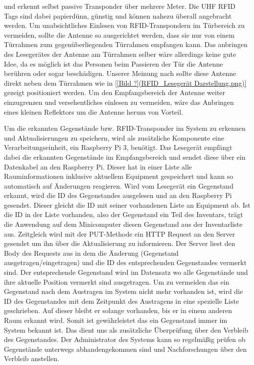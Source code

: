 und erkennt selbst passive Transponder über mehrere Meter. Die UHF RFID Tags
sind dabei papierdünn, günstig und können nahezu überall angebracht werden.
Um unabsichtliches Einlesen von RFID-Transpondern im Türbereich zu vermeiden,
sollte die Antenne so ausgerichtet werden, dass sie nur von einem Türrahmen
zum gegenüberliegenden Türrahmen empfangen kann. Das anbringen des Lesegerätes \bzw
der Antenne am Türrahmen selber wäre allerdings keine gute Idee, da es möglich ist
das Personen beim Passieren der Tür die Antenne berühren oder sogar beschädigen.
Unserer Meinung nach sollte diese Antenne direkt neben dem Türrahmen wie in
\ref{[Bild ?](RFID_Lesegerät Darstellung.png)} gezeigt positioniert werden.
Um den Empfangsbereich der Antenne weiter einzugrenzen und versehentliches
einlesen zu vermeiden, wäre das Anbringen eines kleinen Reflektors um die
Antenne herum von Vorteil.

Um die erkannten Gegenstände bzw. RFID-Transponder im System zu erkennen und
Aktualisierungen zu speichern, wird als zusätzliche Komponente eine
Verarbeitungseinheit, \zB ein Raspberry Pi 3, benötigt. Das Lesegerät empfängt
dabei die erkannten Gegenstände im Empfangsbereich und sendet diese über ein
Datenkabel an den Raspberry Pi. Dieser hat in einer Liste alle
Rauminformationen inklusive aktuellem Equipment gespeichert und kann so
automatisch auf Änderungen reagieren. Wird vom Lesegerät ein Gegenstand
erkannt, wird die ID des Gegenstandes ausgelesen und an den Raspberry Pi
gesendet. Dieser gleicht die ID mit seiner vorhandenen Liste an Equipment ab. 
Ist die ID in der Liste vorhanden, also der Gegenstand ein Teil des Inventars,
trägt die Anwendung auf dem Minicomputer diesen Gegenstand aus der
Inventarliste aus. Zeitgleich wird mit der PUT-Methode ein HTTP Request an den
Server gesendet um ihn über die Aktualisierung zu informieren. Der Server liest
den Body des Requests aus in dem die Änderung (Gegenstand ausgetragen/eingetragen)
und die ID des entsprechenden Gegenstandes vermerkt sind. Der entsprechende
Gegenstand wird im Datensatz wo alle Gegenstände und ihre aktuelle Position
vermerkt sind ausgetragen. Um zu vermeiden das ein Gegenstand nach dem
Austragen im System nicht mehr vorhanden ist, wird die ID des Gegenstandes mit
dem Zeitpunkt des Austragens in eine spezielle Liste geschrieben. Auf dieser
bleibt er solange vorhanden, bis er in einem anderen Raum erkannt wird.
Somit ist gewährleistet das ein Gegenstand immer im System bekannt ist.
Das dient uns als zusätzliche Überprüfung über den Verbleib des Gegenstandes.
Der Administrator des Systems kann so regelmäßig prüfen ob Gegenstände
unterwegs abhandengekommen sind und Nachforschungen über den Verbleib anstellen.

